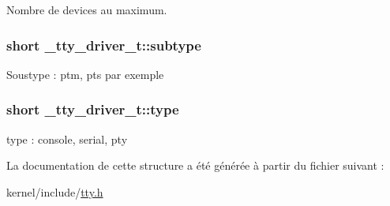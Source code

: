 Nombre de devices au maximum. \hypertarget{struct__tty__driver__t_a291fe7f9436ef9cbe34b490d516f46bd}{
\subsubsection[{subtype}]{\setlength{\rightskip}{0pt plus 5cm}short \-\_\-tty\-\_\-driver\-\_\-t\-::subtype}}\label{struct__tty__driver__t_a291fe7f9436ef9cbe34b490d516f46bd}
Soustype \-: ptm, pts par exemple \hypertarget{struct__tty__driver__t_a0c9f7f164f7454cf2bea36de5e23a5d1}{
\subsubsection[{type}]{\setlength{\rightskip}{0pt plus 5cm}short \-\_\-tty\-\_\-driver\-\_\-t\-::type}}\label{struct__tty__driver__t_a0c9f7f164f7454cf2bea36de5e23a5d1}
type \-: console, serial, pty 

La documentation de cette structure a été générée à partir du fichier suivant \-:\begin{DoxyCompactItemize}
\item 
kernel/include/\hyperlink{tty_8h}{tty.\-h}\end{DoxyCompactItemize}

